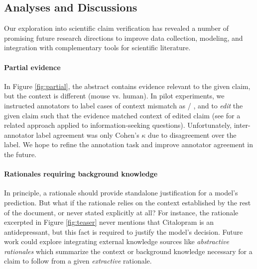 \subsection{Analyses and Discussions}
Our exploration into scientific claim verification has revealed a number of promising future research directions to improve data collection, modeling, and integration with complementary tools for scientific literature.


\paragraph{Partial evidence}

In Figure \ref{fig:partial}, the abstract contains evidence relevant to the given claim, but the context is different (mouse vs. human). In pilot experiments, we instructed annotators to label cases of context mismatch as \spart / \rpart, and to \emph{edit} the given claim such that the evidence matched context of edited claim (see \citet{Min2020AmbigQAAA} for a related approach applied to information-seeking questions). Unfortunately, inter-annotator label agreement was only  Cohen's $\kappa$ due to disagreement over the \ppartial label. We hope to refine the annotation task and improve annotator agreement in the future.




\paragraph{Rationales requiring background knowledge}

In principle, a rationale should provide standalone justification for a model's prediction. But what if the rationale relies on the context established by the rest of the document, or never stated explicitly at all? For instance, the rationale excerpted in Figure \ref{fig:teaser} never mentions that Citalopram is an antidepressant, but this fact is required to justify the model's decision. Future work could explore integrating external knowledge sources like  \emph{abstractive rationales} which summarize the context or background knowledge necessary for a claim to follow from a given \emph{extractive} rationale.

